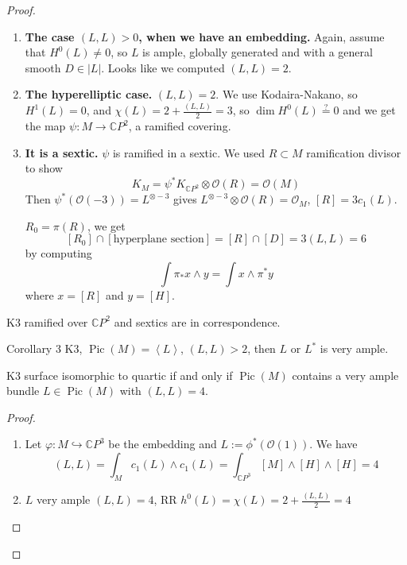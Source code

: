 \begin{proof}\leavevmode
\begin{enumerate}[label=\textbf{Step \arabic*}]
	\item \textbf{The case $(L,L)>0$, when we have an embedding.}\hspace{0.5em} Again, assume that $H^{0}(L)\neq 0$, so $L$ is ample, globally generated and with a general smooth $D\in |L|$. Looks like we computed $(L,L)=2$.

	\item  \textbf{The hyperelliptic case.}\hspace{0.5em} $(L,L)=2$. We use Kodaira-Nakano, so  $H^{1}(L)=0$, and $\chi(L)=2+\frac{(L,L)}{2}=3$, so $\dim H^{0}(L)\overset{?}{=}0$ and we get the map $\psi:M\to \mathbb{C}P^{2}$, a ramified covering.

	\item \textbf{It is a sextic.} \hspace{0.5em} $\psi$ is ramified in a sextic. We used $R\subset M$ ramification divisor to show
		\[K_M=\psi^* K_{\mathbb{C}P^{2}}\otimes \mathcal{O}(R)=\mathcal{O}(M)\]
		Then $\psi^* (\mathcal{O}(-3))=L^{\otimes-3}$ gives $L^{\otimes-3}\otimes \mathcal{O}(R)=\mathcal{O}_M$, $[R]=3c_1(L)$.
		
		$R_0=\pi(R)$, we get
		\[ [R_0] \cap [\text{hyperplane section}]=[R]\cap [D]=3(L,L)=6 \]
		by computing
		\[\int \pi_* x\wedge y=\int x\wedge \pi^*y\]
		where $x=[R]$ and  $y=[H]$.
\end{enumerate}

\begin{remark}[Check!]\leavevmode
	K3 ramified over $\mathbb{C}P^{2}$ and sextics are in correspondence.
\end{remark}

\begin{idea4}{Corollary 3}\leavevmode
	K3, $\operatorname{Pic}(M)= \left<L\right> $, $(L,L)>2$, then  $L$ or $L^*$ is very ample.
\end{idea4}

\begin{prop}\leavevmode
	K3 surface isomorphic to quartic if and only if $\operatorname{Pic}(M)$ contains a very ample bundle $L\in\operatorname{Pic}(M)$ with $(L,L)=4$. 
\end{prop}

\begin{proof}\leavevmode
	\begin{enumerate}[label=\textbf{Step \arabic*}]
		\item Let $\varphi:M\hookrightarrow \mathbb{C}P^{3}$ be the embedding and $L:=\phi^*(\mathcal{O}(1))$. We have
			\[(L,L)=\int_{M}c_1(L)\wedge c_1(L)=\int_{\mathbb{C}P^{3}}[M]\wedge [H]\wedge [H]=4\]
			\item $L$ very ample $(L,L)=4$, RR $h^{0}(L)=\chi(L)=2+\frac{(L,L)}{2}=4$
	\end{enumerate}
\end{proof}


\end{proof}
